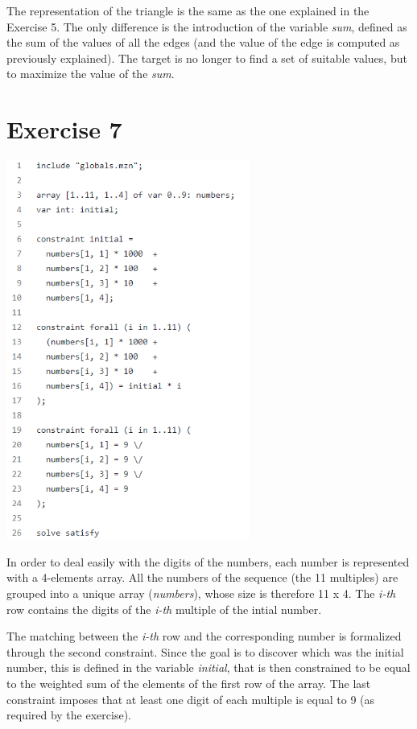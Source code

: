 \documentclass{article}
\begin{document}
The representation of the triangle is the same as the one explained in the Exercise 5. The only
difference is the introduction of the variable \textit{sum}, defined as the sum of the values of 
all the edges (and the value of the edge is computed as previously explained).
The target is no longer to find a set of suitable values, but to maximize the value of the \textit{sum}.

\section{Exercise 7}
\vspace{0.2cm}
\includegraphics[width=8cm]{img/Es7.png}
\vspace{0.2cm}

In order to deal easily with the digits of the numbers, each number is represented with a 4-elements
array. All the numbers of the sequence (the 11 multiples) are grouped into a unique array (\textit{numbers}),
whose size is therefore 11 x 4. The \textit{i-th} row contains the digits of the \textit{i-th} multiple of
the intial number. 

The matching between the \textit{i-th} row and the corresponding number is formalized through
the second constraint. 
Since the goal is to discover which was the initial number, this is defined in the variable
\textit{initial}, that is then constrained to be equal to the weighted sum of the elements of the first
row of the array.
The last constraint imposes that at least one digit of each multiple is equal to 9 (as required by
the exercise).
\end{document}
